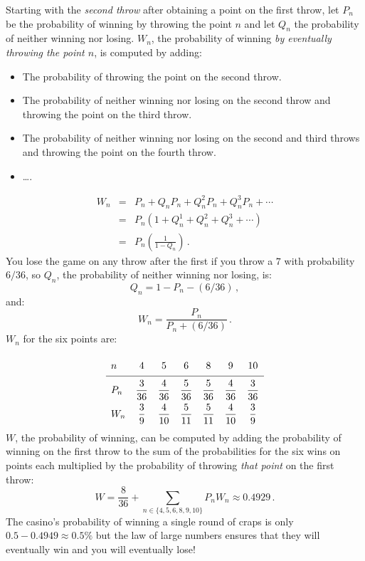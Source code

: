 Starting with the \emph{second throw} after obtaining a point on the first throw, let $P_n$ be the probability of winning by throwing the point $n$ and let $Q_n$ the probability of neither winning nor losing. $W_n$, the probability of winning \emph{by eventually throwing the point $n$}, is computed by adding:
\begin{itemize}
\item The probability of throwing the point on the second throw.
\item The probability of neither winning nor losing on the second throw and throwing the point on the third throw.
\item The probability of neither winning nor losing on the second and third throws and throwing the point on the fourth throw.
\item \ldots .
\end{itemize}
\begin{eqnarray*}
W_n&=&P_n + Q_n P_n + Q_n^2 P_n+ Q_n^3 P_n  + \cdots\\
&=&P_n\left(1+Q_n^1 + Q_n^2+ Q_n^3  + \cdots\right)\\
&=&P_n\left(\frac{1}{1-Q_n}\right)\,.
\end{eqnarray*}
You lose the game on any throw after the first if you throw a $7$ with probability $6/36$, so $Q_n$, the probability of neither winning nor losing, is:
\[
Q_n = 1-P_n-(6/36)\,,
\]
and:
\[
W_n=\frac{P_n}{P_n+(6/36)}\,.
\]
$W_n$ for the six points are:
\[
\renewcommand{\arraystretch}{2}
\begin{array}{lcccccc}
n   & 4 & 5 & 6 & 8 & 9 & 10 \\\hline
P_n & \disfrac{3}{36} & \disfrac{4}{36} & \disfrac{5}{36} & \disfrac{5}{36} & \disfrac{4}{36} & \disfrac{3}{36} \\
W_n & \disfrac{3}{9} & \disfrac{4}{10} & \disfrac{5}{11} & \disfrac{5}{11} & \disfrac{4}{10} & \disfrac{3}{9}
\end{array}
\]
$W$, the probability of winning, can be computed by adding the probability of winning on the first throw to the sum of the probabilities for the six wins on points each multiplied by the probability of throwing \emph{that point} on the first throw:
\begin{equation}\label{eq.9-a}
W=\frac{8}{36}+\sum_{n\in\{4,5,6,8,9,10\}} P_nW_n \approx 0.4929\,.
\end{equation}
The casino's probability of winning a single round of craps is
only $0.5-0.4949\approx 0.5\%$ but the law of large numbers ensures that they will eventually win and you will eventually lose!

